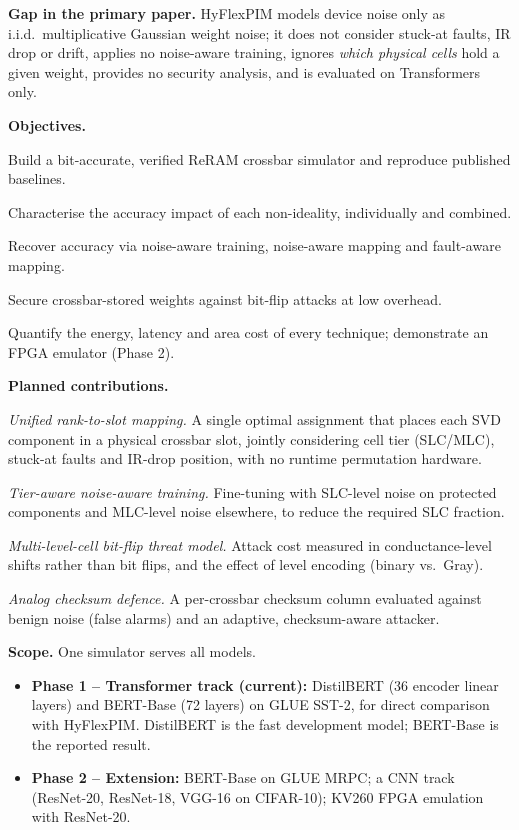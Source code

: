 \documentclass[10pt,a4paper]{article}
\begin{document}
\textbf{Gap in the primary paper.} HyFlexPIM models device noise only as i.i.d.\ multiplicative
Gaussian weight noise; it does not consider stuck-at faults, IR drop or drift, applies no noise-aware
training, ignores \emph{which physical cells} hold a given weight, provides no security analysis, and is
evaluated on Transformers only.

\textbf{Objectives.}
\begin{description}[leftmargin=2.2em,labelwidth=1.8em,font=\normalfont\bfseries]
\item[O1] Build a bit-accurate, verified ReRAM crossbar simulator and reproduce published baselines.
\item[O2] Characterise the accuracy impact of each non-ideality, individually and combined.
\item[O3] Recover accuracy via noise-aware training, noise-aware mapping and fault-aware mapping.
\item[O4] Secure crossbar-stored weights against bit-flip attacks at low overhead.
\item[O5] Quantify the energy, latency and area cost of every technique; demonstrate an FPGA emulator (Phase 2).
\end{description}

\textbf{Planned contributions.}
\begin{description}[leftmargin=2.2em,labelwidth=1.8em,font=\normalfont\bfseries]
\item[C1] \emph{Unified rank-to-slot mapping.} A single optimal assignment that places each SVD
component in a physical crossbar slot, jointly considering cell tier (SLC/MLC), stuck-at faults and
IR-drop position, with no runtime permutation hardware.
\item[C2] \emph{Tier-aware noise-aware training.} Fine-tuning with SLC-level noise on protected
components and MLC-level noise elsewhere, to reduce the required SLC fraction.
\item[C3] \emph{Multi-level-cell bit-flip threat model.} Attack cost measured in conductance-level
shifts rather than bit flips, and the effect of level encoding (binary vs.\ Gray).
\item[C4] \emph{Analog checksum defence.} A per-crossbar checksum column evaluated against benign
noise (false alarms) and an adaptive, checksum-aware attacker.
\end{description}

\textbf{Scope.} One simulator serves all models.
\begin{itemize}
\item \textbf{Phase 1 -- Transformer track (current):} DistilBERT (36 encoder linear layers) and
BERT-Base (72 layers) on GLUE SST-2, for direct comparison with HyFlexPIM. DistilBERT is the fast
development model; BERT-Base is the reported result.
\item \textbf{Phase 2 -- Extension:} BERT-Base on GLUE MRPC; a CNN track (ResNet-20, ResNet-18, VGG-16 on
CIFAR-10); KV260 FPGA emulation with ResNet-20.
\end{itemize}
\end{document}
